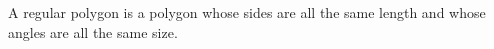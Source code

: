 A regular polygon is a polygon whose sides are all the same length and
whose angles are all the same size.